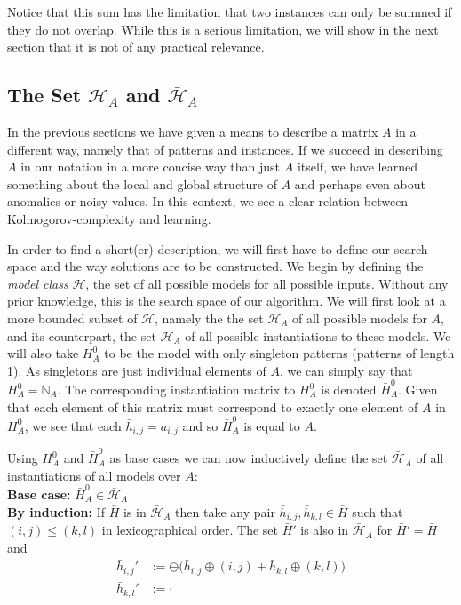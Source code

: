 \documentclass[a4paper,notoc,oneside]{tufte-book}
\begin{document}
Notice that this sum has the limitation that two instances can only be summed if they do not overlap. While this is a serious limitation, we will show in the next section that it is not of any practical relevance.


\subsection{The Set $\mathcal{H}_A$ and $\bar{\mathcal{H}}_A$}\label{thesetH}

In the previous sections we have given a means to describe a matrix $A$ in a different way, namely that of patterns and instances. If we succeed in describing $A$ in our notation in a more concise way than just $A$ itself, we have learned something about the local and global structure of $A$ and perhaps even about anomalies or noisy values. In this context, we see a clear relation between Kolmogorov-complexity and learning. 

In order to find a short(er) description, we will first have to define our search space and the way solutions are to be constructed. We begin by defining the \emph{model class} $\mathcal{H}$, the set of all possible models for all possible inputs. Without any prior knowledge, this is the search space of our algorithm. We will first look at a more bounded subset of $\mathcal{H}$, namely the the set $\mathcal{H}_A$ of all possible models for $A$, and its counterpart, the set $\bar{\mathcal{H}}_A$ of all possible instantiations to these models. We will also take $H_A^0$ to be the model with only singleton patterns (patterns of length 1). As singletons are just individual elements of $A$, we can simply say that $H_A^0=\mathbb{N}_A$. The corresponding instantiation matrix to $H_A^0$ is denoted $\bar{H}_A^0$. Given that each element of this matrix must correspond to exactly one element of $A$ in $H_A^0$, we see that each $\bar{h}_{i,j} = a_{i,j}$ and so $\bar{H}_A^0$ is equal to $A$. 

Using $H_A^0$ and $\bar{H}_A^0$ as base cases we can now inductively define the set $\bar{\mathcal{H}}_A$ of all instantiations of all models over $A$:\\
\textbf{Base case:} $\bar{H}_A^0 \in \bar{\mathcal{H}}_A$\\
\textbf{By induction:} If $\bar{H}$ is in $\bar{\mathcal{H}}_A$ then take any pair $\bar{h}_{i,j},\bar{h}_{k,l} \in \bar{H}$ such that $(i,j)\leq(k,l)$ in lexicographical order. The set $\bar{H}'$ is also in $\bar{\mathcal{H}}_A$ for $\bar{H}' = \bar{H}$ and
\begin{align*}
\bar{h}_{i,j}' &:= \ominus \big( \bar{h}_{i,j} \oplus (i,j) + \bar{h}_{k,l} \oplus (k,l) \big) \\
\bar{h}_{k,l}' &:= \cdot
\end{align*}
\end{document}
